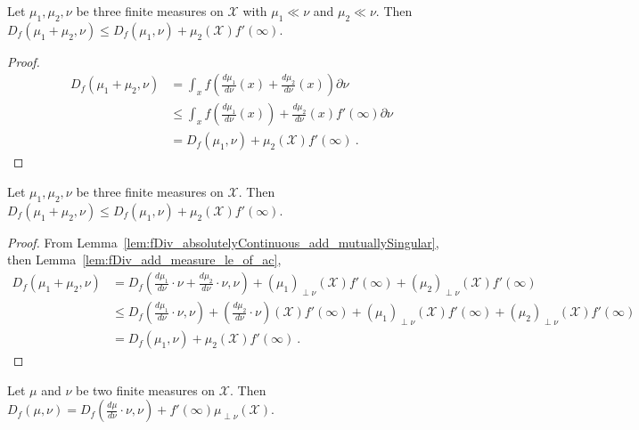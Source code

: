 \begin{lemma}
  \label{lem:fDiv_add_measure_le_of_ac}
  \leanok
  Let $\mu_1, \mu_2, \nu$ be three finite measures on $\mathcal X$ with $\mu_1 \ll \nu$ and $\mu_2 \ll \nu$. Then
  $D_f(\mu_1 + \mu_2, \nu) \le D_f(\mu_1, \nu) + \mu_2(\mathcal X) f'(\infty)$.
\end{lemma}

\begin{proof}\leanok
\begin{align*}
D_f(\mu_1 + \mu_2, \nu)
&= \int_x f \left( \frac{d \mu_1}{d\nu}(x) + \frac{d\mu_2}{d\nu}(x) \right) \partial \nu
\\
&\le \int_x f \left( \frac{d \mu_1}{d\nu}(x) \right) + \frac{d\mu_2}{d\nu}(x) f'(\infty) \partial \nu
\\
&= D_f(\mu_1, \nu) + \mu_2(\mathcal X) f'(\infty)
\: .
\end{align*}
\end{proof}

\begin{lemma}
  \label{lem:fDiv_add_measure_le}
  \leanok
  Let $\mu_1, \mu_2, \nu$ be three finite measures on $\mathcal X$. Then
  $D_f(\mu_1 + \mu_2, \nu) \le D_f(\mu_1, \nu) + \mu_2(\mathcal X) f'(\infty)$.
\end{lemma}

\begin{proof}\leanok
{}
From Lemma~\ref{lem:fDiv_absolutelyContinuous_add_mutuallySingular}, then Lemma~\ref{lem:fDiv_add_measure_le_of_ac},
\begin{align*}
D_f(\mu_1 + \mu_2, \nu)
&= D_f(\frac{d\mu_1}{d \nu}\cdot \nu + \frac{d\mu_2}{d \nu}\cdot \nu, \nu) + (\mu_1)_{\perp\nu}(\mathcal X) f'(\infty) + (\mu_2)_{\perp\nu}(\mathcal X) f'(\infty)
\\
&\le D_f(\frac{d\mu_1}{d \nu}\cdot \nu, \nu) + (\frac{d\mu_2}{d \nu}\cdot \nu)(\mathcal X) f'(\infty) + (\mu_1)_{\perp\nu}(\mathcal X) f'(\infty) + (\mu_2)_{\perp\nu}(\mathcal X) f'(\infty)
\\
&= D_f(\mu_1, \nu) + \mu_2(\mathcal X) f'(\infty)
\: .
\end{align*}
\end{proof}

\begin{lemma}
  \label{lem:fDiv_eq_add_withDensity_derivAtTop}
  \leanok
  Let $\mu$ and $\nu$ be two finite measures on $\mathcal X$.
  Then $D_f(\mu, \nu) = D_f(\frac{d\mu}{d\nu}\cdot \nu, \nu) + f'(\infty) \mu_{\perp \nu}(\mathcal X)$.
\end{lemma}

